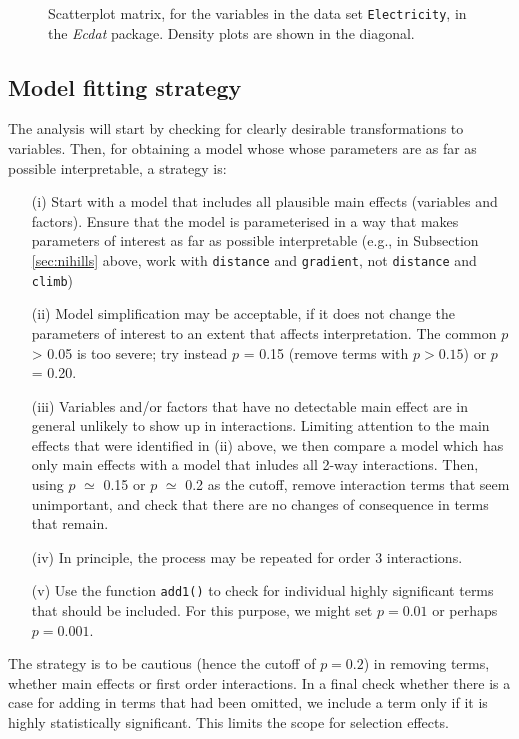 \documentclass{tufte-book}\usepackage[]{graphicx}\usepackage[]{color}
\newcommand{\txtt}[1]{\texttt{#1}}
\begin{document}
\begin{figure}[h]
\caption{Scatterplot matrix, for the variables in the data set
  \texttt{Electricity}, in the {\em Ecdat} package. Density
  plots are shown in the diagonal.\label{fig:elec-spm}}
\end{figure}

\subsection{Model fitting strategy}

The analysis will start by checking for clearly desirable
transformations to variables.  Then, for obtaining a model whose
whose parameters are as far as possible interpretable, a strategy
is:
 \begin{itemize}
 \item[(i)] Start with a model that includes all plausible main effects
   (variables and factors).  Ensure that the model is parameterised in
   a way that makes parameters of interest as far as possible
   interpretable (e.g., in Subsection \ref{sec:nihills} above, work
   with \texttt{distance} and \texttt{gradient}, not \texttt{distance}
   and \texttt{climb})
 \item[(ii)]
   Model simplification may be acceptable, if it does not
   change the parameters of interest to an extent that affects
   interpretation. The common $p$ > 0.05 is too
   severe; try instead
   $p$ = 0.15 (remove terms with $p > 0.15$) or $p$ = 0.20.
 \item[(iii)] Variables and/or factors that have no detectable main
   effect are in general unlikely to show up in interactions.
   Limiting attention to the main effects that were identified in (ii)
   above, we then compare a model which has only main effects with a
   model that inludes all 2-way interactions. Then, using $p$ $\simeq$
   0.15 or $p$ $\simeq$ 0.2 as the cutoff, remove interaction terms
   that seem unimportant, and check that there are no changes of
   consequence in terms that remain.
 \item[(iv)] In principle, the process may be repeated for order 3
   interactions.
\item[(v)] Use the function \txtt{add1()} to check for individual
highly significant terms that should be included.  For this purpose,
we might set $p=0.01$ or perhaps $p=0.001$.
\end{itemize}
The strategy is to be cautious (hence the cutoff of $p=0.2$) in
removing terms, whether main effects or first order interactions.
In a final check whether there is a case for adding in terms that
had been omitted, we include a term only if it is highly statistically
significant.  This limits the scope for selection effects.
\end{document}
